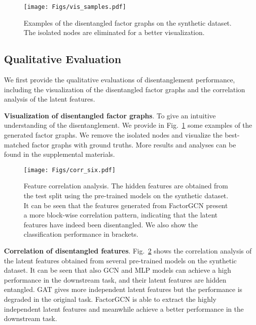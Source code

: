 \documentclass{article}
\begin{document}
\begin{figure}
  \centering
  \texttt{[image: Figs/vis\_samples.pdf]}
   \vspace{-1.3em}
  \caption{Examples of the disentangled factor graphs on the synthetic dataset. 
  The isolated nodes are eliminated for a better visualization.}
  \label{fig:synthetic_vis}
  \vspace{-1.2em}
\end{figure}

\subsection{Qualitative Evaluation}
We first provide the qualitative evaluations of disentanglement performance,
including the visualization of the disentangled factor graphs and 
the correlation analysis of the latent features.

\textbf{Visualization of disentangled factor graphs}.
To give an intuitive understanding of the 
disentanglement. We provide in Fig.~\ref{fig:synthetic_vis}
some examples of the generated factor graphs. 
We remove the isolated nodes and visualize
the best-matched factor graphs with  ground truths.
More results and analyses can be found in the supplemental
materials.

\begin{figure}[ht]
  \centering
  \texttt{[image: Figs/corr\_six.pdf]}
\caption{Feature correlation analysis. The hidden features are obtained from
  the test split using the pre-trained models on the synthetic dataset.
  It can be seen that the features generated 
  from FactorGCN present a more block-wise
  correlation pattern, indicating that 
  the latent features have indeed been disentangled.
  We also show the classification performance in brackets.}
    \label{fig:synthetic_corr}
\end{figure}


\textbf{Correlation of disentangled features}.
Fig.~\ref{fig:synthetic_corr} shows the correlation 
analysis of the latent features
obtained from several pre-trained models on the synthetic dataset.  
It can be seen that also GCN and MLP models can achieve 
a high performance in the downstream task, and
their latent features are hidden entangled. 
GAT gives {more} independent latent features 
but the performance is degraded in the 
original task. FactorGCN is able to extract the highly independent
latent features and meanwhile achieve a better performance in the downstream task.
\end{document}
